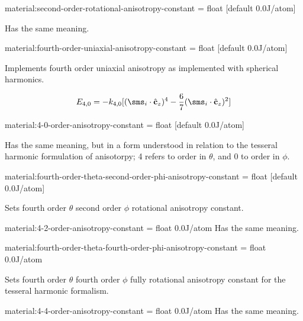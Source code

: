 {\zicf material:second-order-rotational-anisotropy-constant = float [default 0.0\newline J/atom]} Has the same meaning.

{\zicf material:fourth-order-uniaxial-anisotropy-constant = float [default 0.0\newline J/atom]} Implements fourth order uniaxial anisotropy as implemented with spherical harmonics.

\begin{equation*}
  E_{4,0} = - k_{4,0} [ ( \sms_i \cdot \hat{\mathbf{c}}_z )^4 - \frac{6}{7} ( \sms_i \cdot \hat{\mathbf{c}}_z )^2 ]
\end{equation*}

{\zicf material:4-0-order-anisotropy-constant = float [default 0.0\newline J/atom]} Has the same meaning, but in a form understood in relation to the tesseral harmonic formulation of anisotorpy; 4 refers to order in $\theta$, and 0 to order in $\phi$.

{\zicf material:fourth-order-theta-second-order-phi-anisotropy-constant = float [default 0.0\newline J/atom]} Sets fourth order $\theta$ second order $\phi$ rotational anisotropy constant.

{\zicf material:4-2-order-anisotropy-constant = float 0.0\newline J/atom} Has the same meaning.

{\zicf material:fourth-order-theta-fourth-order-phi-anisotropy-constant = float 0.0\newline J/atom} Sets fourth order $\theta$ fourth order $\phi$ fully rotational anisotropy constant for the tesseral harmonic formalism.

{\zicf material:4-4-order-anisotropy-constant = float 0.0\newline J/atom} Has the same meaning.

